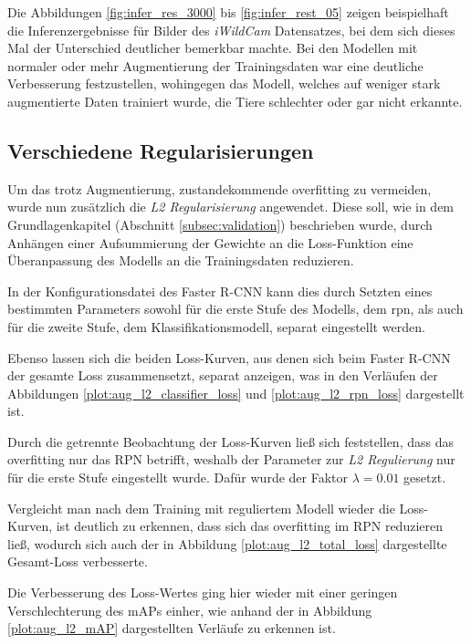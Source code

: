 Die Abbildungen \ref{fig:infer_res_3000} bis \ref{fig:infer_rest_05}
zeigen beispielhaft die Inferenzergebnisse für Bilder des 
\textit{iWildCam} Datensatzes, bei dem sich dieses Mal der 
Unterschied deutlicher bemerkbar machte.
Bei den Modellen mit normaler oder mehr Augmentierung der 
Trainingsdaten war eine deutliche Verbesserung festzustellen, 
wohingegen das Modell, welches auf weniger stark augmentierte 
Daten trainiert wurde, die Tiere schlechter oder gar nicht erkannte.


\subsection{Verschiedene Regularisierungen}

Um das trotz Augmentierung, zustandekommende \Gls{overfitting} zu 
vermeiden, wurde nun zusätzlich die \textit{L2 Regularisierung}
angewendet.
Diese soll, wie in dem Grundlagenkapitel (Abschnitt \ref{subsec:validation})
beschrieben wurde, durch Anhängen einer Aufsummierung der Gewichte
an die Loss-Funktion eine Überanpassung des Modells an die
Trainingsdaten reduzieren.

In der Konfigurationsdatei des Faster R-CNN kann dies
durch Setzten eines bestimmten Parameters sowohl für die
erste Stufe des Modells, dem \Gls{rpn},
als auch für die zweite Stufe, dem Klassifikationsmodell,
separat eingestellt werden.

Ebenso lassen sich die beiden Loss-Kurven, aus denen sich 
beim Faster R-CNN der gesamte Loss zusammensetzt,
separat anzeigen, was in den Verläufen der 
Abbildungen \ref{plot:aug_l2_classifier_loss}
und \ref{plot:aug_l2_rpn_loss} dargestellt ist.

Durch die getrennte Beobachtung der Loss-Kurven ließ sich 
feststellen, dass das \Gls{overfitting} nur das RPN betrifft,
weshalb der Parameter zur \textit{L2 Regulierung} nur 
für die erste Stufe eingestellt wurde.
Dafür wurde der Faktor $\lambda = 0.01$ gesetzt.

Vergleicht man nach dem Training mit 
reguliertem Modell wieder die Loss-Kurven, ist deutlich zu 
erkennen, dass sich das \Gls{overfitting} im RPN 
reduzieren ließ, wodurch sich auch der
in Abbildung \ref{plot:aug_l2_total_loss} 
dargestellte Gesamt-Loss verbesserte.

Die Verbesserung des Loss-Wertes 
ging hier wieder mit einer geringen 
Verschlechterung des mAPs einher, wie anhand der in Abbildung
\ref{plot:aug_l2_mAP} dargestellten Verläufe zu erkennen ist.

